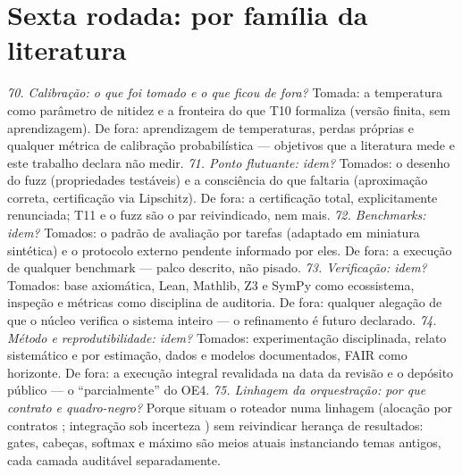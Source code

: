 \section{Sexta rodada: por família da literatura}
\textit{70. Calibração: o que foi tomado e o que ficou de fora?} Tomada: a temperatura como parâmetro de nitidez e a fronteira do que T10 formaliza (versão finita, sem aprendizagem). De fora: aprendizagem de temperaturas, perdas próprias e qualquer métrica de calibração probabilística --- objetivos que a literatura mede e este trabalho declara não medir.
\textit{71. Ponto flutuante: idem?} Tomados: o desenho do fuzz (propriedades testáveis) e a consciência do que faltaria (aproximação correta, certificação via Lipschitz). De fora: a certificação total, explicitamente renunciada; T11 e o fuzz são o par reivindicado, nem mais.
\textit{72. Benchmarks: idem?} Tomados: o padrão de avaliação por tarefas (adaptado em miniatura sintética) e o protocolo externo pendente informado por eles. De fora: a execução de qualquer benchmark --- palco descrito, não pisado.
\textit{73. Verificação: idem?} Tomados: base axiomática, Lean, Mathlib, Z3 e SymPy como ecossistema, inspeção e métricas como disciplina de auditoria. De fora: qualquer alegação de que o núcleo verifica o sistema inteiro --- o refinamento é futuro declarado.
\textit{74. Método e reprodutibilidade: idem?} Tomados: experimentação disciplinada, relato sistemático e por estimação, dados e modelos documentados, FAIR como horizonte. De fora: a execução integral revalidada na data da revisão e o depósito público --- o ``parcialmente'' do OE4.
\textit{75. Linhagem da orquestração: por que contrato e quadro-negro?} Porque situam o roteador numa linhagem (alocação por contratos \cite{smith1980}; integração sob incerteza \cite{erman1980}) sem reivindicar herança de resultados: gates, cabeças, softmax e máximo são meios atuais instanciando temas antigos, cada camada auditável separadamente.
